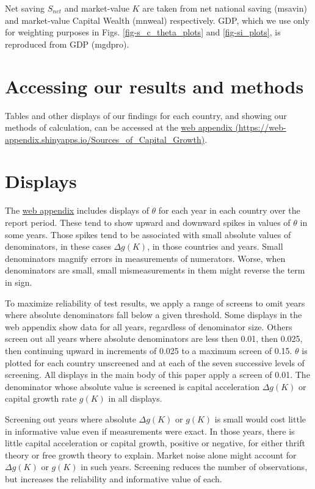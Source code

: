 \documentclass[a4paper,fleqn]{latex_styles/cas-sc}
\begin{document}
Net saving $S_{net}$ and market-value $K$ are taken from net national saving (msavin) and market-value Capital Wealth (mnweal) respectively. GDP, which we use only for weighting purposes in Figs. \ref{fig-s_c_theta_plots} and \ref{fig-si_plots}, is reproduced from GDP (mgdpro).

\hypertarget{accessing-our-results-and-methods}{%
\section{Accessing our results and
methods}\label{accessing-our-results-and-methods}}

Tables and other displays of our findings for each country, and showing
our methods of calculation, can be accessed at the
\href{https://web-appendix.shinyapps.io/Sources\_of\_Capital\_Growth/}{web appendix (https://web-appendix.shinyapps.io/Sources\_of\_Capital\_Growth)}.

\hypertarget{sec-displays}{%
\section{Displays}\label{sec-displays}}

The \href{https://web-appendix.shinyapps.io/Sources\_of\_Capital\_Growth/}{web
appendix} includes displays of \(\theta\) for
each year in each country over the report period. These tend to show
upward and downward spikes in values of \(\theta\)
in some years. Those spikes tend to be associated with small absolute
values of denominators, in these cases \(\Delta g(K)\), in those
countries and years. Small denominators magnify errors in measurements
of numerators. Worse, when denominators are small, small mismeasurements in them might reverse the term in sign.

To maximize reliability of test results, we apply a range of screens to
omit years where absolute denominators fall below a given
threshold. Some displays in the web appendix show data for all years, regardless of denominator size.
Others screen out all years where
absolute denominators are less then 0.01, then 0.025, then continuing upward in
increments of 0.025 to a maximum screen of 0.15. \(\theta\)
is plotted for each country unscreened and at each of the
seven successive levels of screening. All displays in the main body of this paper apply a screen of 0.01. 
The denominator whose absolute value is screened is capital acceleration
$\Delta g(K)$ or capital growth rate \(g(K)\) in all displays. 

Screening out years where absolute \(\Delta g(K)\) or $g(K)$ is small would cost
little in informative value even if measurements were exact. In those
years, there is little capital acceleration or capital growth, positive or negative, for
either thrift theory or free growth theory to explain. Market noise
alone might account for \(\Delta g(K)\) or $g(K)$ in such years. Screening reduces
the number of observations, but increases the reliability and
informative value of each.
\end{document}
